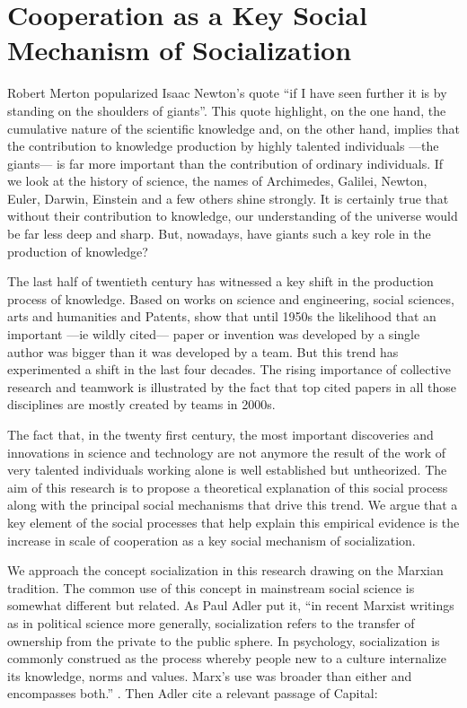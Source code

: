 \chapter{Cooperation as a Key Social Mechanism of Socialization}
\label{intro}

Robert Merton popularized Isaac Newton's quote ``if I have seen further it is by standing on the shoulders of giants''. This quote highlight, on the one hand, the cumulative nature of the scientific knowledge and, on the other hand, implies that the contribution to knowledge production by highly talented individuals ---the giants--- is far more important than the contribution of ordinary individuals. If we look at the history of science, the names of Archimedes, Galilei, Newton, Euler, Darwin, Einstein and a few others shine strongly. It is certainly true that without their contribution to knowledge, our understanding of the universe would be far less deep and sharp. But, nowadays, have giants such a key role in the production of knowledge?  

The last half of twentieth century has witnessed a key shift in the production process of knowledge. Based on works on science and engineering, social sciences, arts and humanities and Patents, \citet*{uzzi:2007a} show that until 1950s the likelihood that an important ---ie wildly cited--- paper or invention was developed by a single author was bigger than it was developed by a team. But this trend has experimented a shift in the last four decades. The rising importance of collective research and teamwork is illustrated by the fact that top cited papers in all those disciplines are mostly created by teams in 2000s.

The fact that, in the twenty first century, the most important discoveries and innovations in science and technology are not anymore the result of the work of very talented individuals working alone is well established but untheorized. The aim of this research is to propose a theoretical explanation of this social process along with the principal social mechanisms that drive this trend. We argue that a key element of the social processes that help explain this empirical evidence is the increase in scale of cooperation as a key social mechanism of socialization.

We approach the concept socialization in this research drawing on the Marxian tradition. The common use of this concept in mainstream social science is somewhat different but related. As Paul Adler put it, ``in recent Marxist writings as in political science more generally, socialization refers to the transfer of ownership from the private to the public sphere. In psychology, socialization is commonly construed as the process whereby people new to a culture internalize its knowledge, norms and values. Marx's use was broader than either and encompasses both.'' \citep[1320]{adler:2007}. Then Adler cite a relevant passage of Capital: 


